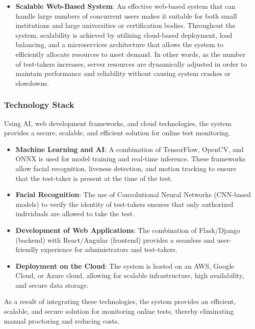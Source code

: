 \documentclass[12pt,a4paper]{article}
\begin{document}
\begin{itemize}
    \item \textbf{Scalable Web-Based System}: An effective web-based system that can handle large numbers of concurrent users makes it suitable for both small institutions and large universities or certification bodies. Throughout the system, scalability is achieved by utilizing cloud-based deployment, load balancing, and a microservices architecture that allows the system to efficiently allocate resources to meet demand. In other words, as the number of test-takers increases, server resources are dynamically adjusted in order to maintain performance and reliability without causing system crashes or slowdowns.
\end{itemize}

\subsubsection{Technology Stack}

Using AI, web development frameworks, and cloud technologies, the system provides a secure, scalable, and efficient solution for online test monitoring.

\begin{itemize}
    \item \textbf{Machine Learning and AI}: A combination of TensorFlow, OpenCV, and ONNX is used for model training and real-time inference. These frameworks allow facial recognition, liveness detection, and motion tracking to ensure that the test-taker is present at the time of the test.

    \item \textbf{Facial Recognition}: The use of Convolutional Neural Networks (CNN-based models) to verify the identity of test-takers ensures that only authorized individuals are allowed to take the test.

    \item \textbf{Development of Web Applications}: The combination of Flask/Django (backend) with React/Angular (frontend) provides a seamless and user-friendly experience for administrators and test-takers.

    \item \textbf{Deployment on the Cloud}: The system is hosted on an AWS, Google Cloud, or Azure cloud, allowing for scalable infrastructure, high availability, and secure data storage.
\end{itemize}

As a result of integrating these technologies, the system provides an efficient, scalable, and secure solution for monitoring online tests, thereby eliminating manual proctoring and reducing costs.
\end{document}
